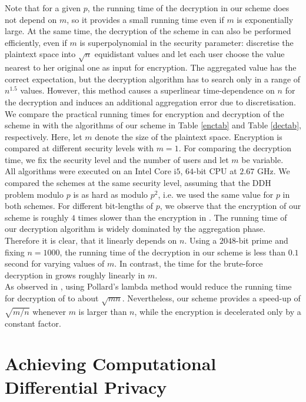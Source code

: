 \documentclass[10pt]{extarticle}
\begin{document}
Note that for a given $p$, the running time of the decryption in our scheme does not depend on $m$, so it provides a small running time even if $m$ is exponentially large. At the same time, the decryption of the scheme in \cite{2} can also be performed efficiently, even if $m$ is superpolynomial in the security parameter: discretise the plaintext space into $\sqrt{n}$ equidistant values and let each user choose the value nearest to her original one as input for encryption. The aggregated value has the correct expectation, but the decryption algorithm has to search only in a range of $n^{1.5}$ values. However, this method causes a superlinear time-dependence on $n$ for the decryption and induces an additional aggregation error due to discretisation.\\
We compare the practical running times for encryption and decryption of the scheme in \cite{2} with the algorithms of our scheme in Table \ref{enctab} and Table \ref{dectab}, respectively. Here, let $m$ denote the size of the plaintext space. Encryption is compared at different security levels with $m=1$. For comparing the decryption time, we fix the security level and the number of users and let $m$ be variable.\\
All algorithms were executed on an Intel Core i$5$, $64$-bit CPU at $2.67$ GHz. We compared the schemes at the same security level, assuming that the DDH problem modulo $p$ is as hard as modulo $p^2$, i.e. we used the same value for $p$ in both schemes. For different bit-lengths of $p$, we observe that the encryption of our scheme is roughly $4$ times slower than the encryption in \cite{2}. The running time of our decryption algorithm is widely dominated by the aggregation phase. Therefore it is clear, that it linearly depends on $n$. Using a $2048$-bit prime and fixing $n=1000$, the running time of the decryption in our scheme is less than $0.1$ second for varying values of $m$. In contrast, the time for the brute-force decryption in \cite{2} grows roughly linearly in $m$.\\
As observed in \cite{2}, using Pollard's lambda method would reduce the running time for decryption of \cite{2} to about $\sqrt{mn}$. Nevertheless, our scheme provides a speed-up of $\sqrt{m/n}$ whenever $m$ is larger than $n$, while the encryption is decelerated only by a constant factor.


\section{Achieving Computational Differential Privacy}\label{cdp}
\end{document}
